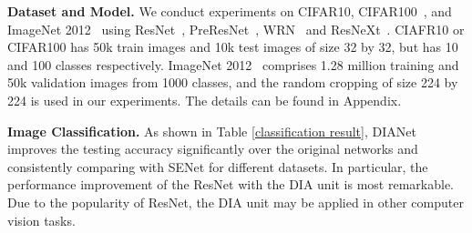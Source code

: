 \documentclass[letterpaper]{article} \usepackage{aaai20}  \usepackage{times}  \usepackage{helvet} \usepackage{courier}  \usepackage[hyphens]{url}  \usepackage{graphicx} \urlstyle{rm} \def\UrlFont{\rm}  \usepackage{graphicx}  \frenchspacing  \setlength{\pdfpagewidth}{8.5in}  \setlength{\pdfpageheight}{11in}  \usepackage{color}
\begin{document}
	\textbf{Dataset and Model.} We conduct experiments on CIFAR10, CIFAR100~\cite{cifar}, and ImageNet 2012~\cite{ILSVRC15} using ResNet~\cite{he2016deep}, PreResNet~\cite{he2016identity}, WRN~\cite{wrn} and ResNeXt~\cite{xie2017aggregated}. CIAFR10 or CIFAR100 has 50k train images and 10k test images of size 32 by 32, but has 10 and 100 classes respectively. ImageNet 2012~\cite{ILSVRC15} comprises 1.28 million training and 50k validation images from 1000 classes, and the random cropping of size 224 by 224 is used in our experiments. The details can be found in Appendix. 
	
	\textbf{Image Classification.} As shown in Table \ref{classification result}, DIANet improves the testing accuracy significantly over the original networks and consistently comparing with SENet for different datasets. In particular, the performance improvement of the ResNet with the DIA unit is most remarkable. Due to the popularity of ResNet, the DIA unit may be applied in other computer vision tasks.	
\end{document}
